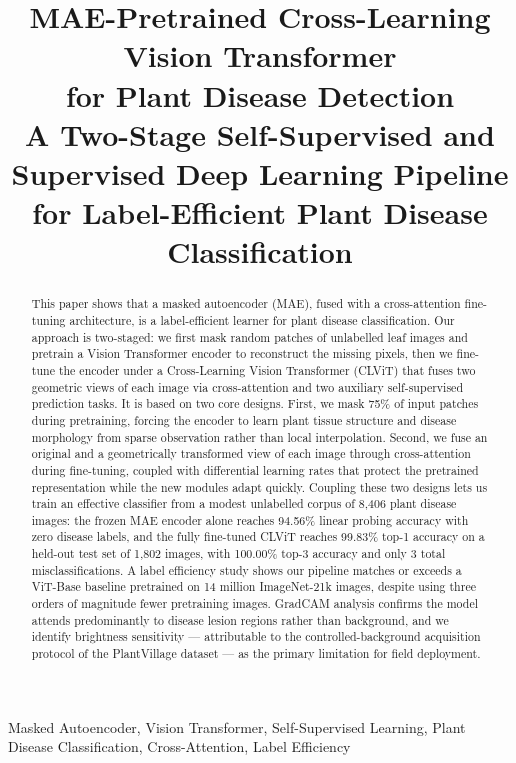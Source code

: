 \documentclass[conference]{IEEEtran}
\begin{document}
\title{
MAE-Pretrained Cross-Learning Vision Transformer\\
for Plant Disease Detection\\
\large A Two-Stage Self-Supervised and Supervised Deep Learning Pipeline
for Label-Efficient Plant Disease Classification
}

\author{
}

\maketitle

\begin{abstract}
This paper shows that a masked autoencoder (MAE), fused with a cross-attention fine-tuning architecture, is a label-efficient learner for plant disease classification. Our approach is two-staged: we first mask random patches of unlabelled leaf images and pretrain a Vision Transformer encoder to reconstruct the missing pixels, then we fine-tune the encoder under a Cross-Learning Vision Transformer (CLViT) that fuses two geometric views of each image via cross-attention and two auxiliary self-supervised prediction tasks. It is based on two core designs. First, we mask 75\% of input patches during pretraining, forcing the encoder to learn plant tissue structure and disease morphology from sparse observation rather than local interpolation. Second, we fuse an original and a geometrically transformed view of each image through cross-attention during fine-tuning, coupled with differential learning rates that protect the pretrained representation while the new modules adapt quickly. Coupling these two designs lets us train an effective classifier from a modest unlabelled corpus of 8,406 plant disease images: the frozen MAE encoder alone reaches 94.56\% linear probing accuracy with zero disease labels, and the fully fine-tuned CLViT reaches 99.83\% top-1 accuracy on a held-out test set of 1,802 images, with 100.00\% top-3 accuracy and only 3 total misclassifications. A label efficiency study shows our pipeline matches or exceeds a ViT-Base baseline pretrained on 14 million ImageNet-21k images, despite using three orders of magnitude fewer pretraining images. GradCAM analysis confirms the model attends predominantly to disease lesion regions rather than background, and we identify brightness sensitivity — attributable to the controlled-background acquisition protocol of the PlantVillage dataset — as the primary limitation for field deployment.
\end{abstract}
\vspace{0.5em}
\begin{IEEEkeywords}
Masked Autoencoder, Vision Transformer, Self-Supervised Learning,
Plant Disease Classification, Cross-Attention, Label Efficiency
\end{IEEEkeywords}
\end{document}
